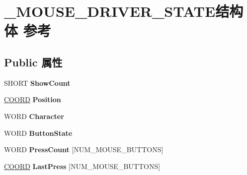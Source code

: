 \hypertarget{struct___m_o_u_s_e___d_r_i_v_e_r___s_t_a_t_e}{}\section{\+\_\+\+M\+O\+U\+S\+E\+\_\+\+D\+R\+I\+V\+E\+R\+\_\+\+S\+T\+A\+T\+E结构体 参考}
\label{struct___m_o_u_s_e___d_r_i_v_e_r___s_t_a_t_e}
\subsection*{Public 属性}
\begin{DoxyCompactItemize}
\item 
\mbox{\label{struct___m_o_u_s_e___d_r_i_v_e_r___s_t_a_t_e_a4608be60abcce2a3c3f7e438ea1c49bf}} 
S\+H\+O\+RT {\bfseries Show\+Count}
\item 
\mbox{\label{struct___m_o_u_s_e___d_r_i_v_e_r___s_t_a_t_e_ae269855b485f2b6b75537bfba29917fa}} 
\hyperlink{struct___c_o_o_r_d}{C\+O\+O\+RD} {\bfseries Position}
\item 
\mbox{\label{struct___m_o_u_s_e___d_r_i_v_e_r___s_t_a_t_e_aff911da966248e06e984e147bf886448}} 
W\+O\+RD {\bfseries Character}
\item 
\mbox{\label{struct___m_o_u_s_e___d_r_i_v_e_r___s_t_a_t_e_a2485d40edbf56300c31f2fe1c3d110fd}} 
W\+O\+RD {\bfseries Button\+State}
\item 
\mbox{\label{struct___m_o_u_s_e___d_r_i_v_e_r___s_t_a_t_e_a60828e53773cfb6321446bd8445c0e65}} 
W\+O\+RD {\bfseries Press\+Count} \mbox{[}N\+U\+M\+\_\+\+M\+O\+U\+S\+E\+\_\+\+B\+U\+T\+T\+O\+NS\mbox{]}
\item 
\mbox{\label{struct___m_o_u_s_e___d_r_i_v_e_r___s_t_a_t_e_a72bd11bdcc62abb5dda0eee97501e603}} 
\hyperlink{struct___c_o_o_r_d}{C\+O\+O\+RD} {\bfseries Last\+Press} \mbox{[}N\+U\+M\+\_\+\+M\+O\+U\+S\+E\+\_\+\+B\+U\+T\+T\+O\+NS\mbox{]}
\item 

\end{DoxyCompactItemize}
